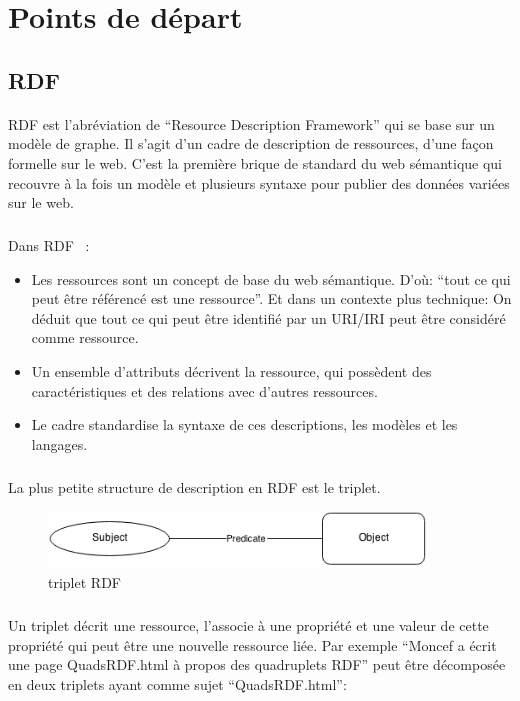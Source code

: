 \section*{Points de départ}
\subsection*{RDF}
\paragraph{}
RDF est l’abréviation de “Resource Description Framework” qui se base sur un modèle de graphe. Il s’agit d’un cadre de description de ressources, d’une façon formelle sur le web.
C’est la première brique de standard du web sémantique qui recouvre à la fois un modèle et plusieurs syntaxe pour publier des données variées sur le web.
\subparagraph{}
Dans RDF ~: 
\newline 
\begin{itemize}
\item Les ressources sont un concept de base du web sémantique. D’où:  “tout ce qui peut être référencé est une ressource”. Et dans un contexte plus technique: On déduit que tout ce qui peut être identifié par un URI/IRI peut être considéré comme ressource.
\item  Un ensemble d’attributs décrivent la ressource, qui possèdent des caractéristiques et des relations avec d’autres ressources.
\item Le cadre standardise la syntaxe de ces descriptions, les modèles et les langages.  
\end{itemize}
\subparagraph{}
La plus petite structure de description en RDF est le triplet.
\begin{figure}[H]
        \centering
                \centering
                \includegraphics[width=10cm]{tripletrdf.png}
               \caption{triplet RDF}

\end{figure}
\subparagraph{}
Un triplet décrit une ressource, l’associe à une propriété et une valeur de cette propriété qui peut être une nouvelle ressource liée.
\newline
Par exemple “Moncef a écrit une page QuadsRDF.html à propos des quadruplets RDF” peut être décomposée en deux triplets ayant comme sujet “QuadsRDF.html”:
